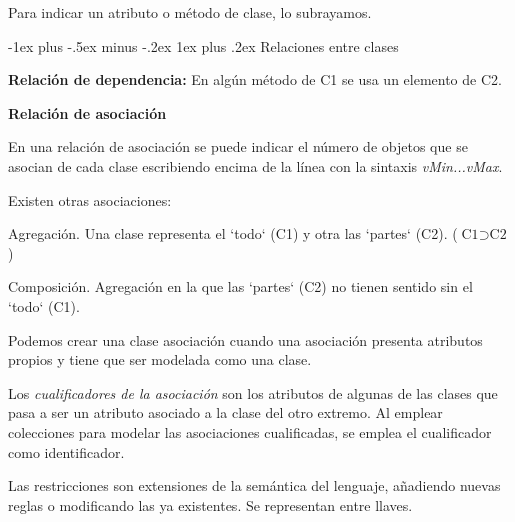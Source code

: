 \documentclass[10pt,a4paper,landscape]{article}
\makeatletter
\renewcommand{\subsubsection}{\@startsection{subsubsection}{3}{0mm}%
                                {-1ex plus -.5ex minus -.2ex}%
                                {1ex plus .2ex}%
                                {\normalfont\small\bfseries}}
\makeatother
\begin{document}
\begin{multicols}{3}
Para indicar un atributo o método de clase, lo subrayamos.

\subsubsection{Relaciones entre clases}


\hskip 4pt \parbox{4cm}{
   \textbf{Relación de dependencia:}
En algún método de C1 se usa un elemento de C2.
}

\hskip 4pt \parbox{4cm}{
   \textbf{Relación de asociación}
}

En una relación de asociación se puede indicar el número de objetos que se
asocian de cada clase escribiendo encima de la línea con la sintaxis
\textit{vMin...vMax}.

Existen otras asociaciones:

\hskip 4pt \parbox{4cm}{
   Agregación. Una clase representa el `todo` (C1) y otra las `partes` (C2).
   ($\text{C1} \supset \text{C2}$)
 }

\hskip 4pt \parbox{4cm}{
   Composición. Agregación en la que las `partes` (C2)  no tienen sentido sin el
   `todo` (C1).
 }

 Podemos crear una clase asociación cuando una asociación presenta atributos
 propios y tiene que ser modelada como una clase.

 Los \textit{cualificadores de la asociación} son los atributos de algunas de las clases
 que pasa a ser un atributo asociado a la clase del otro extremo. Al emplear
 colecciones para modelar las asociaciones cualificadas, se emplea el
 cualificador como identificador.

 Las restricciones son extensiones de la semántica del lenguaje, añadiendo
 nuevas reglas o modificando las ya existentes. Se representan entre llaves.


\end{multicols}
\end{document}
